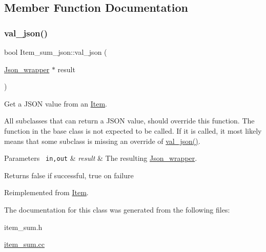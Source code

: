 \subsection{Member Function Documentation}
\mbox{\label{classItem__sum__json_af07ece41d4b8cbf1cb45a485c718880e}} 
\subsubsection{\texorpdfstring{val\+\_\+json()}{val\_json()}}
{\footnotesize\ttfamily bool Item\+\_\+sum\+\_\+json\+::val\+\_\+json (\begin{DoxyParamCaption}\item[{\mbox{\hyperlink{classJson__wrapper}{Json\+\_\+wrapper}} $\ast$}]{result }\end{DoxyParamCaption})\hspace{0.3cm}{\ttfamily [virtual]}}

Get a J\+S\+ON value from an \mbox{\hyperlink{classItem}{Item}}.

All subclasses that can return a J\+S\+ON value, should override this function. The function in the base class is not expected to be called. If it is called, it most likely means that some subclass is missing an override of \mbox{\hyperlink{classItem__sum__json_af07ece41d4b8cbf1cb45a485c718880e}{val\+\_\+json()}}.


\begin{DoxyParams}[1]{Parameters}
\mbox{\texttt{ in,out}}  & {\em result} & The resulting \mbox{\hyperlink{classJson__wrapper}{Json\+\_\+wrapper}}.\\
\hline
\end{DoxyParams}
\begin{DoxyReturn}{Returns}
false if successful, true on failure 
\end{DoxyReturn}


Reimplemented from \mbox{\hyperlink{classItem_a57e763fcde2d0a819d21e31c59611290}{Item}}.



The documentation for this class was generated from the following files\+:\begin{DoxyCompactItemize}
\item 
item\+\_\+sum.\+h\item 
\mbox{\hyperlink{item__sum_8cc}{item\+\_\+sum.\+cc}}\end{DoxyCompactItemize}
